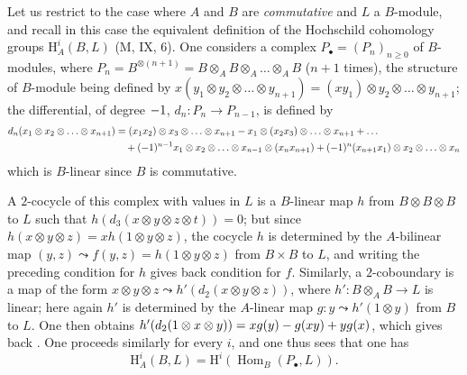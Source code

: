 \begin{env}[18.4.4]
\label{0.18.4.4}
Let us restrict to the case where $A$ and $B$ are \emph{commutative} and $L$ a $B$-module, and recall in this case the equivalent definition of the Hochschild cohomology groups $\mathrm{H}^i_A(B,L)$ (M, IX, 6).
One considers a complex $P_\bullet=(P_n)_{n\geqslant 0}$ of $B$-modules, where $P_n=B^{\otimes(n+1)}=B\otimes_A B\otimes_A\ldots\otimes_A B$ ($n+1$ times), the structure of $B$-module being defined
by $x(y_1\otimes y_2\otimes\ldots\otimes y_{n+1})=(xy_1)\otimes y_2\otimes\ldots\otimes y_{n+1}$; the differential, of degree $- 1$, $d_n:P_n\to P_{n-1}$, is defined by
\begin{align*}
  d_n(x_1\otimes x_2\otimes\ldots\otimes x_{n+1})&=(x_1 x_2)\otimes x_3\otimes\ldots\otimes x_{n+1}- x_1\otimes(x_2 x_3)\otimes\ldots\otimes x_{n+1}+\ldots\\
  &\quad +(- 1)^{n-1} x_1\otimes x_2\otimes\ldots\otimes x_{n-1}\otimes(x_n x_{n+1})+(- 1)^n(x_{n+1} x_1)\otimes x_2\otimes\ldots\otimes x_n
\end{align*}
which is $B$-linear since $B$ is commutative.

A $2$-cocycle of this complex with values in $L$ is a $B$-linear map $h$ from $B\otimes B\otimes B$ to $L$ such that $h(d_3(x\otimes y\otimes z\otimes t))=0$; but since $h(x\otimes y\otimes z)=xh(1\otimes y\otimes z)$, the cocycle $h$ is determined by the $A$-bilinear map $(y,z)\leadsto f(y,z)=h(1\otimes y\otimes z)$ from $B\times B$ to $L$, and writing the preceding condition for $h$ gives back condition  for $f$.
Similarly, a $2$-coboundary is a map of the form $x\otimes y\otimes z\leadsto h'(d_2(x\otimes y\otimes z))$, where $h':B\otimes_A B\to L$ is linear; here again $h'$ is determined by the $A$-linear map $g:y\leadsto h'(1\otimes y)$ from $B$ to $L$.
One then obtains $h'(d_2(1\otimes x\otimes y))=xg(y)- g(xy)+yg(x)$, which gives back .
One proceeds similarly for every $i$, and one thus sees that one has
\begin{equation}
\tag{18.4.4.1}
  \label{0.18.4.4.1}
  \mathrm{H}^i_A(B,L)=\mathrm{H}^i(\operatorname{Hom}_B(P_\bullet,L)).
\end{equation}
\end{env}


